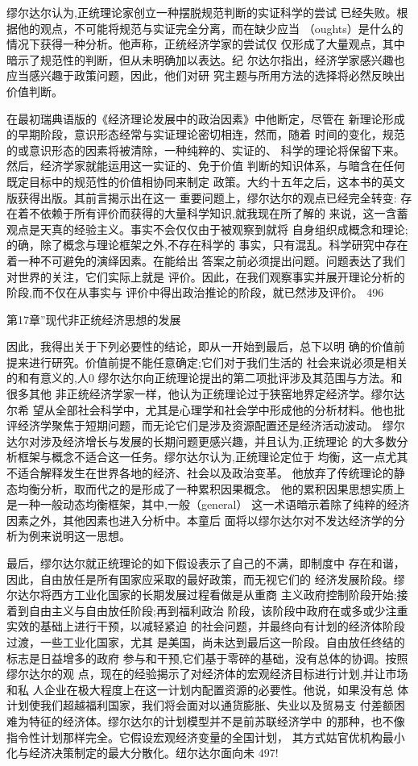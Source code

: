 缪尔达尔认为,正统理论家创立一种摆脱规范判断的实证科学的尝试
已经失败。根据他的观点，不可能将规范与实证完全分离，而在缺少应当
（oughts）是什么的情况下获得一种分析。他声称，正统经济学家的尝试仅
仅形成了大量观点，其中暗示了规范性的判断，但从未明确加以表达。纪
尔达尔指出，经济学家感兴趣也应当感兴趣于政策问题，因此，他们对研
究主题与所用方法的选择将必然反映出价值判断。

在最初瑞典语版的《经济理论发展中的政治因素》中他断定，尽管在
新理论形成的早期阶段，意识形态经常与实证理论密切相连，然而，随着
时间的变化，规范的或意识形态的因素将被清除，一种纯粹的、实证的、
科学的理论将保留下来。然后，经济学家就能运用这一实证的、免于价值
判断的知识体系，与暗含在任何既定目标中的规范性的价值相协同来制定
政策。大约十五年之后，这本书的英文版获得出版。其前言揭示出在这一
重要问题上，缪尔达尔的观点已经完全转变:
存在着不依赖于所有评价而获得的大量科学知识,就我现在所了解的
来说，这一含蓄观点是天真的经验主义。事实不会仅仅由于被观察到就将
自身组织成概念和理论;的确，除了概念与理论框架之外,不存在科学的
事实，只有混乱。科学研究中存在着一种不可避免的演绎因素。在能给出
答案之前必须提出问题。问题表达了我们对世界的关注，它们实际上就是
评价。因此，在我们观察事实并展开理论分析的阶段,而不仅在从事实与
评价中得出政治推论的阶段，就已然涉及评价。
496


第17章”现代非正统经济思想的发展

因此，我得出关于下列必要性的结论，即从一开始到最后，总下以明
确的价值前提来进行研究。价值前提不能任意确定;它们对于我们生活的
社会来说必须是相关的和有意义的,人0
缪尔达尔向正统理论提出的第二项批评涉及其范围与方法。和很多其他
非正统经济学家一样，他认为正统理论过于狭窑地界定经济学。缪尔达尔希
望从全部社会科学中，尤其是心理学和社会学中形成他的分析材料。他也批
评经济学聚焦于短期问题，而无论它们是涉及资源配置还是经济活动波动。
缪尔达尔对涉及经济增长与发展的长期问题更感兴趣，并且认为,正统理论
的大多数分析框架与概念不适合这一任务。缪尔达尔认为,正统理论定位于
均衡，这一点尤其不适合解释发生在世界各地的经济、社会以及政治变革。
他放弃了传统理论的静态均衡分析，取而代之的是形成了一种累积因果概念。
他的累积因果思想实质上是一种一般动态均衡框架，其中,一般（general）
这一术语暗示着除了纯粹的经济因素之外，其他因素也进入分析中。本童后
面将以缪尔达尔对不发达经济学的分析为例来说明这一思想。

最后，缪尔达尔就正统理论的如下假设表示了自己的不满，即制度中
存在和谐，因此，自由放任是所有国家应采取的最好政策，而无视它们的
经济发展阶段。缪尔达尔将西方工业化国家的长期发展过程看做是从重商
主义政府控制阶段开始;接着到自由主义与自由放任阶段;再到福利政治
阶段，该阶段中政府在或多或少注重实效的基础上进行干预，以减轻紧迫
的社会问题，并最终向有计划的经济体阶段过渡，一些工业化国家，尤其
是美国，尚未达到最后这一阶段。自由放任终结的标志是日益增多的政府
参与和干预,它们基于零碎的基础，没有总体的协调。按照缪尔达尔的观
点，现在的经验揭示了对经济体的宏观经济目标进行计划,并让市场和私
人企业在极大程度上在这一计划内配置资源的必要性。他说，如果没有总
体计划使我们超越福利国家，我们将会面对以通货膨胀、失业以及贸易支
付差额困难为特征的经济体。缪尔达尔的计划模型并不是前苏联经济学中
的那种，也不像指令性计划那样完全。它假设宏观经济变量的全国计划，
其方式姑官优机构最小化与经济决策制定的最大分散化。纽尔达尔面向未
497!


